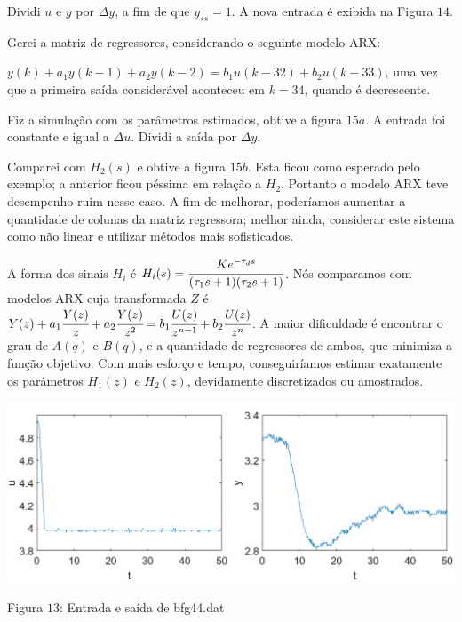 \documentclass{rbfin}
\begin{document}
Dividi $u$ e $y$ por $\Delta y$, a fim de que $y_{ss} = 1$. A nova entrada é exibida na Figura $14$.

Gerei a matriz de regressores, considerando o seguinte modelo ARX:

$y(k) + a_1 y(k-1) + a_2 y(k-2) = b_1 u(k - 32) + b_2 u(k - 33)$, uma vez que a primeira saída considerável aconteceu em $k = 34$, quando é decrescente.

Fiz a simulação com os parâmetros estimados, obtive a figura $15a$. A entrada foi constante e igual a $\Delta u$. Dividi a saída por $\Delta y$.

Comparei com $H_2(s)$ e obtive a figura $15b$. Esta ficou como esperado pelo exemplo; a anterior ficou péssima em relação a $H_2$. Portanto o modelo ARX teve desempenho ruim nesse caso. A fim de melhorar, poderíamos aumentar a quantidade de colunas da matriz regressora; melhor ainda, considerar este sistema como não linear e utilizar métodos mais sofisticados.

A forma dos sinais $H_i$ é $H_i(s) = \cfrac{K e^{-\tau_d s}}{(\tau_1 s + 1)(\tau_2 s + 1)}$. Nós comparamos com modelos ARX cuja transformada $Z$ é $Y(z) + a_1 \cfrac{Y(z)}{z} + a_2 \cfrac{Y(z)}{z^2} = b_1 \cfrac{U(z)}{z^{n-1}} + b_2 \cfrac{U(z)}{z^n}$. A maior dificuldade é encontrar o grau de $A(q)$ e $B(q)$, e a quantidade de regressores de ambos, que minimiza a função objetivo. Com mais esforço e tempo, conseguiríamos estimar exatamente os parâmetros $H_1(z)$ e $H_2(z)$, devidamente discretizados ou amostrados.

\begin{center}
\includegraphics[scale=0.65]{44_1}

Figura $13$: Entrada e saída de bfg44.dat
\end{center}
\end{document}

